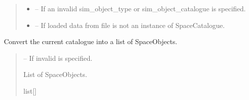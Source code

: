 \documentclass[letterpaper,10pt,english]{sphinxmanual}
\begin{document}
\begin{fulllineitems}
\begin{fulllineitems}
\begin{quote}
\begin{description}
\end{description}\end{quote}

\end{fulllineitems}

\begin{quote}\begin{description}
\begin{itemize}
\item {} 
\sphinxAtStartPar
{} – If an invalid sim\_object\_type or sim\_object\_catalogue is specified.

\item {} 
\sphinxAtStartPar
{} – If loaded data from file is not an instance of SpaceCatalogue.

\end{itemize}

\end{description}\end{quote}

\begin{fulllineitems}
\label{\detokenize{fspsim.utils:fspsim.utils.SpaceCatalogue.SpaceCatalogue.Catalogue2SpaceObjects}}
\pysigstartsignatures
{}
\pysigstopsignatures
\sphinxAtStartPar
Convert the current catalogue into a list of SpaceObjects.
\begin{quote}\begin{description}
\sphinxAtStartPar
{} – If invalid  is specified.

\sphinxAtStartPar
List of SpaceObjects.

\sphinxAtStartPar
list{[}{\hyperref[\detokenize{fspsim.utils:fspsim.utils.SpaceObject.SpaceObject}]{}}{]}

\end{description}\end{quote}

\end{fulllineitems}



\end{fulllineitems}
\end{document}
